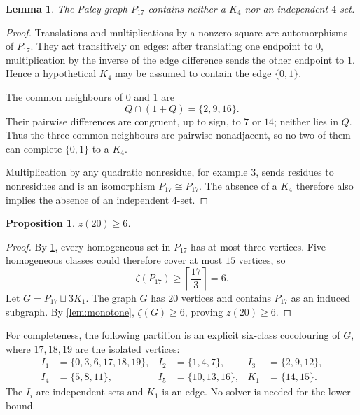 \documentclass[11pt,a4paper]{article}
\newtheorem{lemma}[theorem]{Lemma}
\newtheorem{proposition}[theorem]{Proposition}
\theoremstyle{definition}
\theoremstyle{remark}
\begin{document}
\begin{lemma}\label{lem:paley}
The Paley graph \(P_{17}\) contains neither a \(K_4\) nor an independent
\(4\)-set.
\end{lemma}

\begin{proof}
Translations and multiplications by a nonzero square are automorphisms of
\(P_{17}\).  They act transitively on edges: after translating one endpoint
to \(0\), multiplication by the inverse of the edge difference sends the
other endpoint to \(1\).  Hence a hypothetical \(K_4\) may be assumed to
contain the edge \(\{0,1\}\).

The common neighbours of \(0\) and \(1\) are
\[
  Q\cap(1+Q)=\{2,9,16\}.
\]
Their pairwise differences are congruent, up to sign, to \(7\) or \(14\);
neither lies in \(Q\).  Thus the three common neighbours are pairwise
nonadjacent, so no two of them can complete \(\{0,1\}\) to a \(K_4\).

Multiplication by any quadratic nonresidue, for example \(3\), sends
residues to nonresidues and is an isomorphism
\(P_{17}\cong\overline{P_{17}}\).  The absence of a \(K_4\) therefore also
implies the absence of an independent \(4\)-set.
\end{proof}

\begin{proposition}\label{prop:lower}
\(z(20)\geq6\).
\end{proposition}

\begin{proof}
By \cref{lem:paley}, every homogeneous set in \(P_{17}\) has at most three
vertices.  Five homogeneous classes could therefore cover at most
\(15\) vertices, so
\[
  \zeta(P_{17})\geq \left\lceil\frac{17}{3}\right\rceil=6.
\]
Let \(G=P_{17}\sqcup3K_1\).  The graph \(G\) has \(20\) vertices and contains
\(P_{17}\) as an induced subgraph.  By \cref{lem:monotone},
\(\zeta(G)\geq6\), proving \(z(20)\geq6\).
\end{proof}

For completeness, the following partition is an explicit six-class
cocolouring of \(G\), where \(17,18,19\) are the isolated vertices:
\[
\begin{aligned}
 I_1&=\{0,3,6,17,18,19\},&
 I_2&=\{1,4,7\},&
 I_3&=\{2,9,12\},\\
 I_4&=\{5,8,11\},&
 I_5&=\{10,13,16\},&
 K_1&=\{14,15\}.
\end{aligned}
\]
The \(I_i\) are independent sets and \(K_1\) is an edge.  No solver is
needed for the lower bound.
\end{document}
